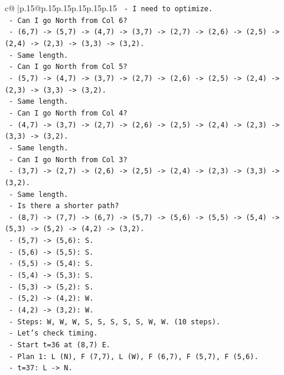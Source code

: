 \documentclass{article}
\begin{document}
{\begin{supertabular}{c@{$\;$}|p{.15\linewidth}@{}p{.15\linewidth}p{.15\linewidth}p{.15\linewidth}p{.15\linewidth}p{.15\linewidth}}
{{{\texttt{  {-} I need to optimize.} \\
\texttt{  {-} Can I go North from Col 6?} \\
\texttt{    {-} (6,7) {-}> (5,7) {-}> (4,7) {-}> (3,7) {-}> (2,7) {-}> (2,6) {-}> (2,5) {-}> (2,4) {-}> (2,3) {-}> (3,3) {-}> (3,2).} \\
\texttt{    {-} Same length.} \\
\texttt{  {-} Can I go North from Col 5?} \\
\texttt{    {-} (5,7) {-}> (4,7) {-}> (3,7) {-}> (2,7) {-}> (2,6) {-}> (2,5) {-}> (2,4) {-}> (2,3) {-}> (3,3) {-}> (3,2).} \\
\texttt{    {-} Same length.} \\
\texttt{  {-} Can I go North from Col 4?} \\
\texttt{    {-} (4,7) {-}> (3,7) {-}> (2,7) {-}> (2,6) {-}> (2,5) {-}> (2,4) {-}> (2,3) {-}> (3,3) {-}> (3,2).} \\
\texttt{    {-} Same length.} \\
\texttt{  {-} Can I go North from Col 3?} \\
\texttt{    {-} (3,7) {-}> (2,7) {-}> (2,6) {-}> (2,5) {-}> (2,4) {-}> (2,3) {-}> (3,3) {-}> (3,2).} \\
\texttt{    {-} Same length.} \\
\texttt{  {-} Is there a shorter path?} \\
\texttt{  {-} (8,7) {-}> (7,7) {-}> (6,7) {-}> (5,7) {-}> (5,6) {-}> (5,5) {-}> (5,4) {-}> (5,3) {-}> (5,2) {-}> (4,2) {-}> (3,2).} \\
\texttt{    {-} (5,7) {-}> (5,6): S.} \\
\texttt{    {-} (5,6) {-}> (5,5): S.} \\
\texttt{    {-} (5,5) {-}> (5,4): S.} \\
\texttt{    {-} (5,4) {-}> (5,3): S.} \\
\texttt{    {-} (5,3) {-}> (5,2): S.} \\
\texttt{    {-} (5,2) {-}> (4,2): W.} \\
\texttt{    {-} (4,2) {-}> (3,2): W.} \\
\texttt{    {-} Steps: W, W, W, S, S, S, S, S, W, W. (10 steps).} \\
\texttt{    {-} Let's check timing.} \\
\texttt{    {-} Start t=36 at (8,7) E.} \\
\texttt{    {-} Plan 1: L (N), F (7,7), L (W), F (6,7), F (5,7), F (5,6).} \\
\texttt{      {-} t=37: L {-}> N.} \\
}}}
\end{supertabular}}
\end{document}

